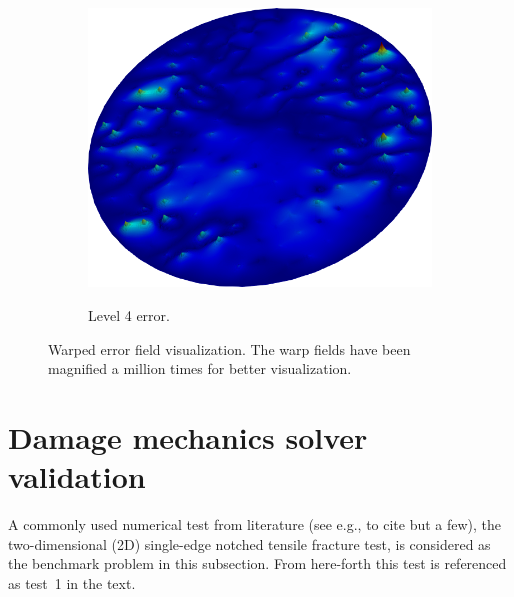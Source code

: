 \documentclass{report}
\begin{document}
\begin{figure}
\begin{subfigure}[t]{.3\linewidth}
\begin{minipage}{1\textwidth}
 	\end{minipage}\\\vspace{1.5cm}  
  \includegraphics[width=1\textwidth]{./Images/error-s8.png}
   \caption{Level 4 error.}
 \end{subfigure}
 \caption{Warped error field visualization. The warp fields have been magnified a million times for better visualization.}\label{fig:errorfiled}
 \end{figure}
 
 
\section{Damage mechanics solver validation \label{sec:Numerical-benchmarks}}
A commonly used numerical test from literature (see e.g., \cite{Ambati2014,Liu2016,jeong2018phase,Hirshikesh2018} to cite but a few), the two-dimensional (2D) single-edge notched tensile fracture test, is considered as the benchmark problem in this subsection. From here-forth this test is referenced as test~1 in the text. 
\end{document}
